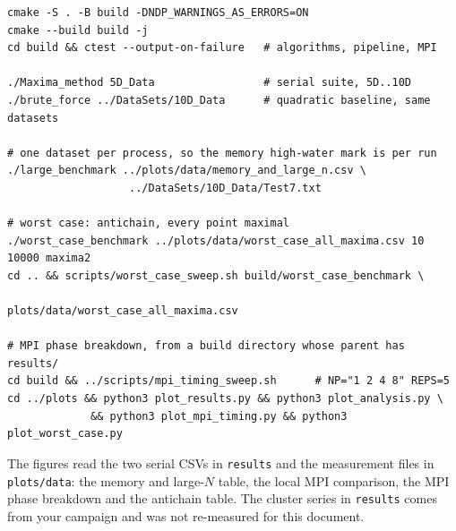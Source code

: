 \documentclass[11pt,a4paper]{article}
\newcommand{\code}[1]{\texttt{#1}}
\begin{document}
{\small
\begin{verbatim}
cmake -S . -B build -DNDP_WARNINGS_AS_ERRORS=ON
cmake --build build -j
cd build && ctest --output-on-failure   # algorithms, pipeline, MPI

./Maxima_method 5D_Data                 # serial suite, 5D..10D
./brute_force ../DataSets/10D_Data      # quadratic baseline, same datasets

# one dataset per process, so the memory high-water mark is per run
./large_benchmark ../plots/data/memory_and_large_n.csv \
                   ../DataSets/10D_Data/Test7.txt

# worst case: antichain, every point maximal
./worst_case_benchmark ../plots/data/worst_case_all_maxima.csv 10 10000 maxima2
cd .. && scripts/worst_case_sweep.sh build/worst_case_benchmark \
                                    plots/data/worst_case_all_maxima.csv

# MPI phase breakdown, from a build directory whose parent has results/
cd build && ../scripts/mpi_timing_sweep.sh      # NP="1 2 4 8" REPS=5
cd ../plots && python3 plot_results.py && python3 plot_analysis.py \
             && python3 plot_mpi_timing.py && python3 plot_worst_case.py
\end{verbatim}
}

The figures read the two serial CSVs in \code{results} and the measurement
files in \code{plots/data}: the memory and large-$N$ table, the local MPI
comparison, the MPI phase breakdown and the antichain table. The cluster series
in \code{results} comes from your campaign and was not re-measured for this
document.
\end{document}

